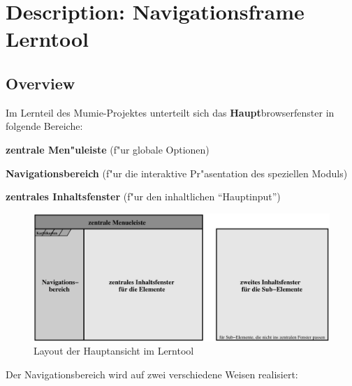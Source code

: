 
\section{Description: Navigationsframe Lerntool}\label{description}


\subsection{Overview}\label{overview}


Im Lernteil des Mumie-Projektes unterteilt sich das
\textbf{Haupt}browserfenster in folgende Bereiche:

\begin{list_sabina}
        \item \textbf{zentrale Men"uleiste} (f"ur globale Optionen)
        \item \textbf{Navigationsbereich} (f"ur die interaktive Pr"asentation des speziellen Moduls)
        \item \textbf{zentrales Inhaltsfenster} (f"ur den inhaltlichen ``Hauptinput'')
\end{list_sabina}

\begin{figure}[h]
\begin{center}
\ifx\pdfoutput\undefined
\else
  \includegraphics{Skizzen/gesamtszenario_01.pdf}
\fi
\caption{Layout der Hauptansicht im Lerntool}
\end{center}
\end{figure}


Der Navigationsbereich wird auf zwei verschiedene Weisen realisiert:

